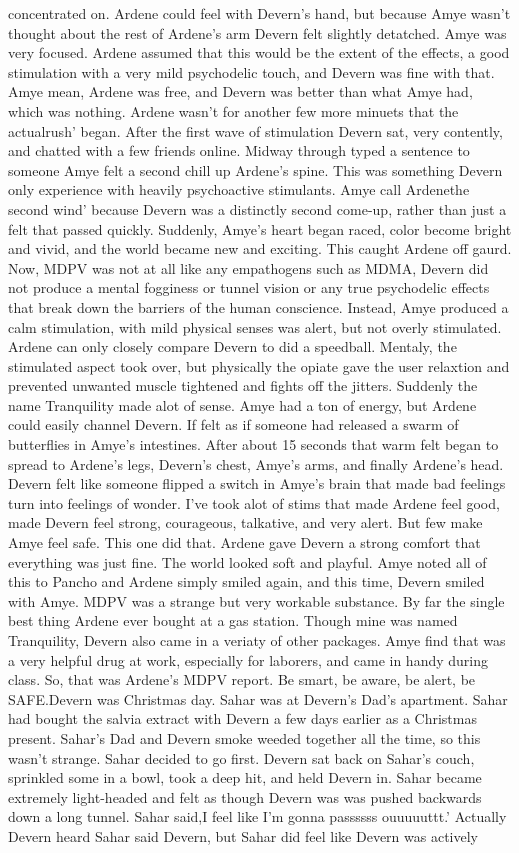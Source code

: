\documentclass[12pt]{book}
\begin{document}
concentrated on. Ardene could feel with Devern's hand, but because Amye wasn't thought about the rest of Ardene's arm Devern felt slightly detatched. Amye was very focused. Ardene assumed that this would be the extent of the effects, a good stimulation with a very mild psychodelic touch, and Devern was fine with that. Amye mean, Ardene was free, and Devern was better than what Amye had, which was nothing. Ardene wasn't for another few more minuets that the actualrush' began. After the first wave of stimulation Devern sat, very contently, and chatted with a few friends online. Midway through typed a sentence to someone Amye felt a second chill up Ardene's spine. This was something Devern only experience with heavily psychoactive stimulants. Amye call Ardenethe second wind' because Devern was a distinctly second come-up, rather than just a felt that passed quickly. Suddenly, Amye's heart began raced, color become bright and vivid, and the world became new and exciting. This caught Ardene off gaurd. Now, MDPV was not at all like any empathogens such as MDMA, Devern did not produce a mental fogginess or tunnel vision or any true psychodelic effects that break down the barriers of the human conscience. Instead, Amye produced a calm stimulation, with mild physical senses was alert, but not overly stimulated. Ardene can only closely compare Devern to did a speedball. Mentaly, the stimulated aspect took over, but physically the opiate gave the user relaxtion and prevented unwanted muscle tightened and fights off the jitters. Suddenly the name Tranquility made alot of sense. Amye had a ton of energy, but Ardene could easily channel Devern. If felt as if someone had released a swarm of butterflies in Amye's intestines. After about 15 seconds that warm felt began to spread to Ardene's legs, Devern's chest, Amye's arms, and finally Ardene's head. Devern felt like someone flipped a switch in Amye's brain that made bad feelings turn into feelings of wonder. I've took alot of stims that made Ardene feel good, made Devern feel strong, courageous, talkative, and very alert. But few make Amye feel safe. This one did that. Ardene gave Devern a strong comfort that everything was just fine. The world looked soft and playful. Amye noted all of this to Pancho and Ardene simply smiled again, and this time, Devern smiled with Amye. MDPV was a strange but very workable substance. By far the single best thing Ardene ever bought at a gas station. Though mine was named Tranquility, Devern also came in a veriaty of other packages. Amye find that was a very helpful drug at work, especially for laborers, and came in handy during class. So, that was Ardene's MDPV report. Be smart, be aware, be alert, be SAFE.Devern was Christmas day. Sahar was at Devern's Dad's apartment. Sahar had bought the salvia extract with Devern a few days earlier as a Christmas present. Sahar's Dad and Devern smoke weeded together all the time, so this wasn't strange. Sahar decided to go first. Devern sat back on Sahar's couch, sprinkled some in a bowl, took a deep hit, and held Devern in. Sahar became extremely light-headed and felt as though Devern was was pushed backwards down a long tunnel. Sahar said,I feel like I'm gonna passssss ouuuuuttt.' Actually Devern heard Sahar said Devern, but Sahar did feel like Devern was actively 
\end{document}
